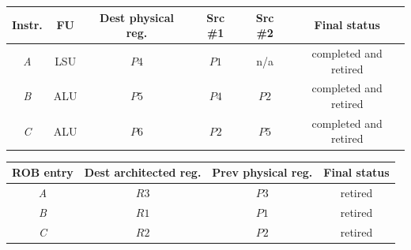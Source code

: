     {\small
\begin{center}
    \renewcommand{\arraystretch}{1.15}
    \begin{tabular}{|c|c|c|c|c|c|}
        \hline
        Instr.
        & FU  & Dest physical reg.
        & Src \#1 & Src \#2 & Final status          \\
        \hline
        \textit{A} & LSU & $P4$               & $P1$    & n/a     & completed and retired \\
        \hline
        \textit{B} & ALU & $P5$               & $P4$    & $P2$    & completed and retired \\
        \hline
        \textit{C} & ALU & $P6$               & $P2$    & $P5$    & completed and retired \\
        \hline
    \end{tabular}

    \vspace{1ex}

    \begin{tabular}{|c|c|c|c|}
        \hline
        ROB entry  & Dest architected reg.
        & Prev physical reg.
        & Final status \\
        \hline
        \textit{A} & $R3$                  & $P3$               & retired      \\
        \hline
        \textit{B} & $R1$                  & $P1$               & retired      \\
        \hline
        \textit{C} & $R2$                  & $P2$               & retired      \\
        \hline
    \end{tabular}

    \vspace{1ex}


\end{center}}
